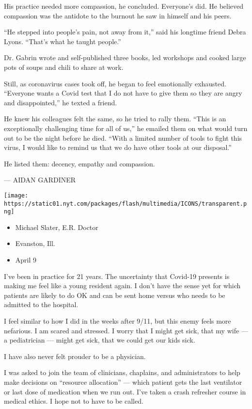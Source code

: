 His practice needed more compassion, he concluded. Everyone's did. He
believed compassion was the antidote to the burnout he saw in himself
and his peers.

``He stepped into people's pain, not away from it,'' said his longtime
friend Debra Lyons. ``That's what he taught people.''

Dr. Gabrin wrote and self-published three books, led workshops and
cooked large pots of soups and chili to share at work.

Still, as coronavirus cases took off, he began to feel emotionally
exhausted. ``Everyone wants a Covid test that I do not have to give them
so they are angry and disappointed,'' he texted a friend.

He knew his colleagues felt the same, so he tried to rally them. ``This
is an exceptionally challenging time for all of us,'' he emailed them on
what would turn out to be the night before he died. ``With a limited
number of tools to fight this virus, I would like to remind us that we
do have other tools at our disposal.''

He listed them: decency, empathy and compassion.

--- AIDAN GARDINER

\texttt{[image: https://static01.nyt.com/packages/flash/multimedia/ICONS/transparent.png]}

\begin{itemize}
\tightlist
\item
  Michael Slater, E.R. Doctor
\item
  Evanston, Ill.
\item
  April 9
\end{itemize}

I've been in practice for 21 years. The uncertainty that Covid-19
presents is making me feel like a young resident again. I don't have the
sense yet for which patients are likely to do OK and can be sent home
versus who needs to be admitted to the hospital.

I feel similar to how I did in the weeks after 9/11, but this enemy
feels more nefarious. I am scared and stressed. I worry that I might get
sick, that my wife --- a pediatrician --- might get sick, that we could
get our kids sick.

I have also never felt prouder to be a physician.

I was asked to join the team of clinicians, chaplains, and
administrators to help make decisions on ``resource allocation'' ---
which patient gets the last ventilator or last dose of medication when
we run out. I've taken a crash refresher course in medical ethics. I
hope not to have to be called.

